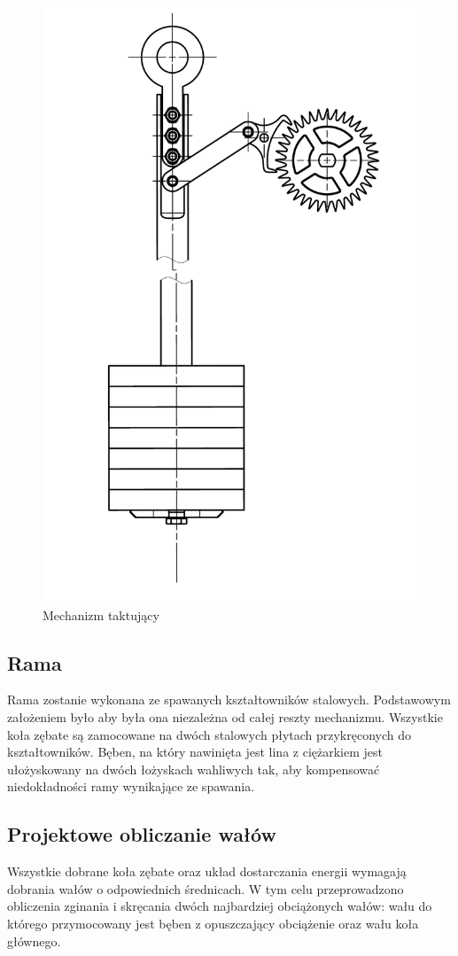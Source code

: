 			\begin{figure}[th]
				\centering
				\includegraphics[width=0.6\linewidth]{Projekt/takt}
				\caption{Mechanizm taktujący}
				\label{fig:takt}
			\end{figure}
			
	
        \subsection{Rama}
        	Rama zostanie wykonana ze spawanych kształtowników stalowych. Podstawowym założeniem było aby była ona niezależna od całej reszty mechanizmu. Wszystkie koła zębate są zamocowane na dwóch stalowych płytach przykręconych do kształtowników. Bęben, na który nawinięta jest lina z ciężarkiem jest ułożyskowany na dwóch łożyskach wahliwych tak, aby kompensować niedokładności ramy wynikające ze spawania.
        	
        	
        \subsection{Projektowe obliczanie wałów}
        	Wszystkie dobrane koła zębate oraz układ dostarczania energii wymagają dobrania wałów o odpowiednich średnicach.
        	W tym celu przeprowadzono obliczenia zginania i skręcania dwóch najbardziej obciążonych wałów: wału do którego przymocowany jest bęben z opuszczający obciążenie oraz wału koła głównego.
        	
